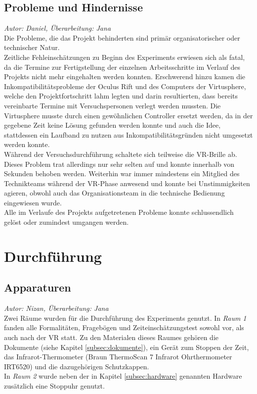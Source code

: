\documentclass{Bericht}
\begin{document}
\subsection{Probleme und Hindernisse}
\textit{Autor: Daniel, Überarbeitung: Jana}\\
Die Probleme, die das Projekt behinderten sind primär organisatorischer oder technischer Natur.\\
Zeitliche Fehleinschätzungen zu Beginn des Experiments erwiesen sich als fatal, da die Termine zur Fertigstellung der einzelnen Arbeitsschritte im Verlauf des Projekts nicht mehr eingehalten werden konnten.
Erschwerend hinzu kamen die Inkompatibilitätsprobleme der Oculus Rift und des Computers der Virtusphere, welche den Projektfortschritt lahm legten und darin resultierten, dass bereits vereinbarte Termine mit Versuchspersonen verlegt werden mussten. Die Virtusphere musste durch einen gewöhnlichen Controller ersetzt werden, da in der gegebene Zeit keine Lösung gefunden werden konnte und auch die Idee, stattdessen ein Laufband zu nutzen aus Inkompatibilitätsgründen nicht umgesetzt werden konnte.\\
	Während der Versuchsdurchführung schaltete sich teilweise die VR-Brille ab. Dieses Problem trat allerdings nur sehr selten auf und konnte innerhalb von Sekunden behoben werden. Weiterhin war immer mindestens ein Mitglied des Technikteams während der VR-Phase anwesend und konnte bei Unstimmigkeiten agieren, obwohl auch das Organisationsteam in die technische Bedienung eingewiesen wurde.\\
	Alle im Verlaufe des Projekts aufgetretenen Probleme konnte schlussendlich gelöst oder zumindest umgangen werden.
	\label{sec:hindernisse}

\section{Durchführung}
\subsection{Apparaturen}
\textit{Autor: Nizan, Überarbeitung: Jana}\\
Zwei Räume wurden für die Durchführung des Experiments genutzt. In  \textit{Raum 1} fanden alle Formalitäten, Fragebögen und Zeiteinschätzungstest sowohl vor, als auch nach der VR statt. Zu den Materialen dieses Raumes gehören die Dokumente (siehe Kapitel \ref{subsec:dokumente}), ein Gerät zum Stoppen der Zeit, das Infrarot-Thermometer (Braun ThermoScan 7 Infrarot Ohrthermometer IRT6520) und die dazugehörigen Schutzkappen. \\
In \textit{Raum 2} wurde neben der in Kapitel \ref{subsec:hardware} genannten Hardware zusätzlich eine Stoppuhr genutzt. 
\end{document}
